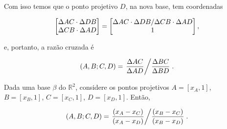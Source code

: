 \begin{sol}
Com isso temos que o ponto projetivo $D$, na nova base, tem coordenadas

\begin{equation}
	 \begin{bmatrix} \Delta AC \cdot \Delta DB \\ \Delta CB \cdot \Delta AD \\  \end{bmatrix} = \begin{bmatrix} \Delta AC \cdot \Delta DB / \Delta CB \cdot \Delta AD \\ 1 \\  \end{bmatrix},
\end{equation}

e, portanto, a razão cruzada é

\begin{equation}
	 (A, B; C, D) = \left. \frac{\Delta AC}{\Delta AD} \middle/ \frac{\Delta BC}{\Delta BD}\right..
\end{equation}

\end{sol}

\begin{cor}
Dada uma base \(\beta\) do \(\mathbb{R}^2\), considere os pontos projetivos $A = [x_A,1]$, $B = [x_B,1]$, $C = [x_C,1]$, $D = [x_D,1]$.
Então,

\begin{equation}
	 (A, B; C, D) = \left. \frac{(x_A - x_C)}{(x_A - x_D)} \middle/ \frac{(x_B - x_C)}{(x_B - x_D)}\right..
\end{equation}

\end{cor}

